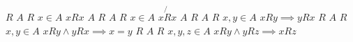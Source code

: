 \documentclass{article}
\begin{document}
$R$
$A$
$R$
$x \in A$
$x R x$
$A$
$R$
$A$
$R$
$x \in A$
$x \not{R} x$
$A$
$R$
$A$
$R$
$x, y \in A$
$x R y \implies y R x$
$R$
$A$
$R$
$x, y \in A$
$x R y \land y R x \implies x = y$
$R$
$A$
$R$
$x, y, z \in A$
$x R y \land y R z \implies x R z$
\end{document}
